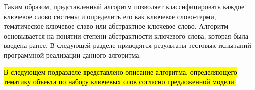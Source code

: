 %
%





Таким образом, представленный алгоритм позволяет классифицировать каждое ключевое слово системы и определить его как ключевое слово-терми, тематическое ключевое слово или абстрактное ключевое слово. Алгоритм основывается на понятии степени абстрактности ключевого слова, которая была введена ранее. В следующей разделе приводятся результаты тестовых испытаний программной реализации данного алгоритма.

\hl{В следующем подразделе представлено описание алгоритма, определяющего тематику объекта по набору ключевых слов согласно предложенной модели.}



